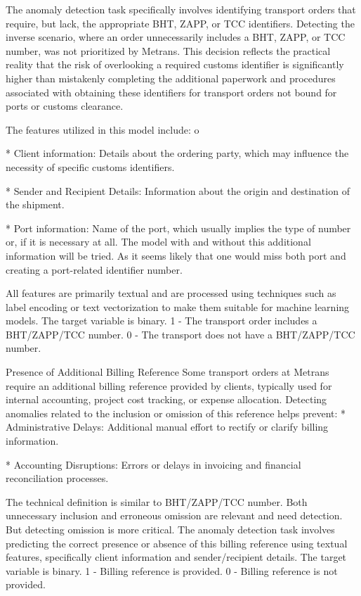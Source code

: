 The anomaly detection task specifically involves identifying transport orders that require, but lack, the appropriate BHT, ZAPP, or TCC identifiers. Detecting the inverse scenario, where an order unnecessarily includes a BHT, ZAPP, or TCC number, was not prioritized by Metrans. This decision reflects the practical reality that the risk of overlooking a required customs identifier is significantly higher than mistakenly completing the additional paperwork and procedures associated with obtaining these identifiers for transport orders not bound for ports or customs clearance.

The features utilized in this model include:
\begitems \style o

* Client information: Details about the ordering party, which may influence the necessity of specific customs identifiers.

* Sender and Recipient Details: Information about the origin and destination of the shipment.

* Port information: Name of the port, which usually implies the type of number or, if it is necessary at all. The model with and without this additional information will be tried. As it seems likely that one would miss both port and creating a port-related identifier number.
\enditems

All features are primarily textual and are processed using techniques such as label encoding or text vectorization to make them suitable for machine learning models. The target variable is binary. 1 - The transport order includes a BHT/ZAPP/TCC number. 0 - The transport does not have a BHT/ZAPP/TCC number.

\sec Presence of Additional Billing Reference
Some transport orders at Metrans require an additional billing reference provided by clients, typically used for internal accounting, project cost tracking, or expense allocation. Detecting anomalies related to the inclusion or omission of this reference helps prevent:
\begitems
* Administrative Delays: Additional manual effort to rectify or clarify billing information.

* Accounting Disruptions: Errors or delays in invoicing and financial reconciliation processes.
\enditems

The technical definition is similar to BHT/ZAPP/TCC number. Both unnecessary inclusion and erroneous omission are relevant and need detection. But detecting omission is more critical. The anomaly detection task involves predicting the correct presence or absence of this billing reference using textual features, specifically client information and sender/recipient details. The target variable is binary. 1 - Billing reference is provided. 0 - Billing reference is not provided.


